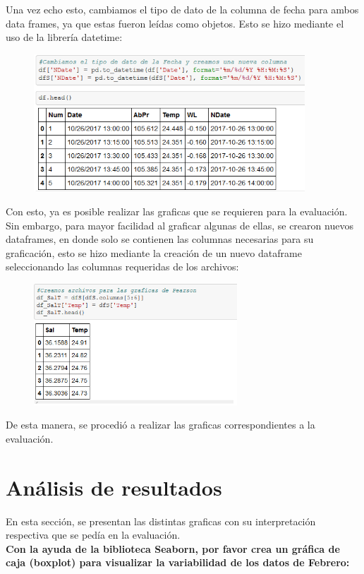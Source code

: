 \documentclass[12pt]{article}
\begin{document}
Una vez echo esto, cambiamos el tipo de dato de la columna de fecha para ambos data frames, ya que estas fueron leídas como objetos. Esto se hizo mediante el uso de la librería datetime:

\begin{figure}[h]
    \centering
\includegraphics[width=4in]{date.png}
\end{figure}

Con esto, ya es posible realizar las graficas que se requieren para la evaluación. Sin embargo, para mayor facilidad al graficar algunas de ellas, se crearon nuevos dataframes, en donde solo se contienen las columnas necesarias para su graficación, esto se hizo mediante la creación de un nuevo dataframe seleccionando las columnas requeridas de los archivos:

\begin{figure}[h]
    \centering
\includegraphics[width=3in]{Nuevodf.png}
\end{figure}

De esta manera, se procedió a realizar las graficas correspondientes a la evaluación. 

\section{Análisis de resultados}
En esta sección, se presentan las distintas graficas con su interpretación respectiva que se pedía en la evaluación. \\

\noindent\textbf {Con la ayuda de la biblioteca Seaborn,  por favor crea un gráfica de caja (boxplot) para visualizar la variabilidad de los datos de Febrero: } \\
\end{document}
